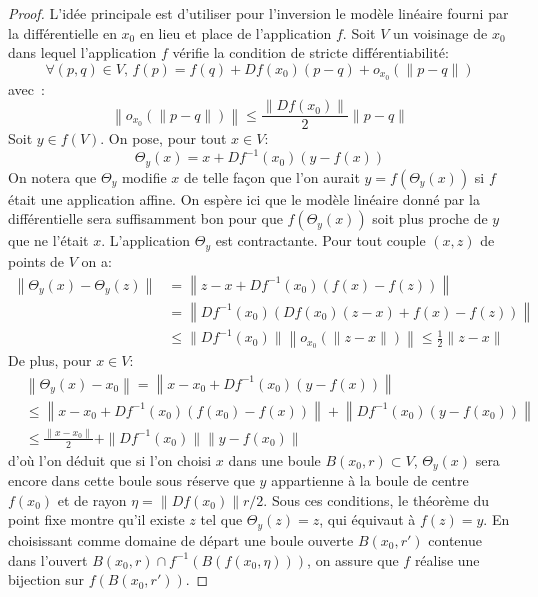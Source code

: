 \begin{proof}
L'idée principale est d'utiliser pour l'inversion le modèle linéaire fourni par la différentielle en $x_0$ en lieu et place de l'application $f$. 
Soit $V$ un voisinage de $x_0$ dans lequel l'application $f$ vérifie la condition de stricte différentiabilité:
\[
\forall (p,q) \in V, \, f(p)=f(q) +Df(x_0)(p-q) + o_{x_0}\left(\|p-q\|\right)
\]
avec~:
\[
 \left\|o_{x_0}\left(\|p-q\|\right)\right\| \leq \frac{\|Df(x_0)\|}{2} \|p-q\|
\]
Soit $y \in f(V)$. On pose, pour tout $x \in V$:
\[
\Theta_y(x) = x + Df^{-1}(x_0)\left(y-f(x)\right)
\]
On notera que $\Theta_y$ modifie $x$ de telle façon que l'on aurait $y=f(\Theta_y(x))$ si $f$ était une application affine. On espère ici que le modèle linéaire donné par la différentielle sera suffisamment bon pour que $f(\Theta_y(x))$ soit plus proche de $y$ que ne l'était $x$. L'application $\Theta_y$ est contractante. Pour tout couple $(x,z)$ de points de $V$ on a:
\begin{align*}
\left\|\Theta_y(x) - \Theta_y(z)\right\| &  = \left\|z-x + Df^{-1}(x_0)\left(f(x)-f(z)\right) \right \| \\
& = \left\|Df^{-1}(x_0)\left( Df(x_0)(z-x) + f(x)-f(z)\right) \right \| \\
& \leq \|Df^{-1}(x_0)\|  \left\|o_{x_0}\left(\|z-x\|\right)\right\| \leq \frac{1}{2} \|z-x\|
\end{align*}
De plus, pour $x \in V$:
\begin{align*}
&\left\| \Theta_y(x) - x_0 \right \|  = \left \| x-x_0 + Df^{-1}(x_0)\left(y-f(x)\right) \right \| \\
& \leq \left \| x-x_0 + Df^{-1}(x_0)\left(f(x_0)-f(x) \right) \right \| + \left\| Df^{-1}(x_0)\left(y-f(x_0)\right)\right\| \\
& \leq \frac{\|x-x_0\|}{2} + \|Df^{-1}(x_0)\|\|y-f(x_0)\|
\end{align*}
d'où l'on déduit que si l'on choisi $x$ dans une boule $B(x_0,r) \subset V$, $\Theta_y(x)$ sera encore dans cette boule sous réserve que $y$ appartienne à la boule de centre $f(x_0)$ et de rayon $\eta=\|Df(x_0)\|r/2$. Sous ces conditions, le théorème du point fixe montre qu'il existe $z$ tel que $\Theta_y(z)=z$, qui équivaut à $f(z)=y$. En choisissant comme domaine de départ une boule ouverte $B(x_0,r\prime)$ contenue dans l'ouvert $B(x_0,r) \cap f^{-1}(B(f(x_0,\eta)))$, on assure que $f$ réalise une bijection sur $f(B(x_0,r\prime))$.


\end{proof}
